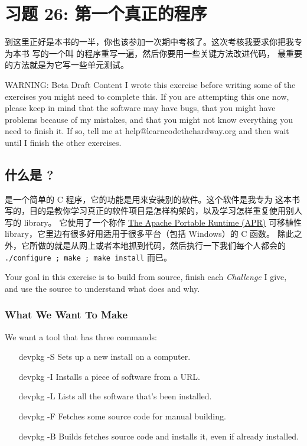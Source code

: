 \chapter{习题 26: 第一个真正的程序}

到这里正好是本书的一半，你也该参加一次期中考核了。这次考核我要求你把我专为本书
写的一个叫  的程序重写一遍，然后你要用一些关键方法改进代码，
最重要的方法就是为它写一些单元测试。

\begin{aside}{WARNING: Beta Draft Content}
I wrote this exercise before writing some of the exercises you might
need to complete this.  If you are attempting this one now, please
keep in mind that the software may have bugs, that you might have
problems because of my mistakes, and that you might not know everything
you need to finish it.  If so, tell me at help@learncodethehardway.org
and then wait until I finish the other exercises.
\end{aside}

\section{什么是 ?}

 是一个简单的 C 程序，它的功能是用来安装别的软件。这个软件是我专为
这本书写的，目的是教你学习真正的软件项目是怎样构架的，以及学习怎样重复使用别人写的 library。
它使用了一个称作 \href{http://apr.apache.org/}{The Apache Portable
Runtime (APR)} 可移植性 library，它里边有很多好用适用于很多平台（包括 Windows）的 C 函数。
除此之外，它所做的就是从网上或者本地抓到代码，然后执行一下我们每个人都会的 
\verb|./configure ; make ; make install| 而已。

Your goal in this exercise is to build  from source, 
finish each \emph{Challenge} I give, and use the source to understand
what  does and why.


\subsection{What We Want To Make}

We want a tool that has three commands:

\begin{enumerate}
\item[devpkg -S] Sets up a new install on a computer.
\item[devpkg -I] Installs a piece of software from a URL.
\item[devpkg -L] Lists all the software that's been installed.
\item[devpkg -F] Fetches some source code for manual building.
\item[devpkg -B] Builds fetches source code and installs it, even if already installed.
\end{enumerate}

